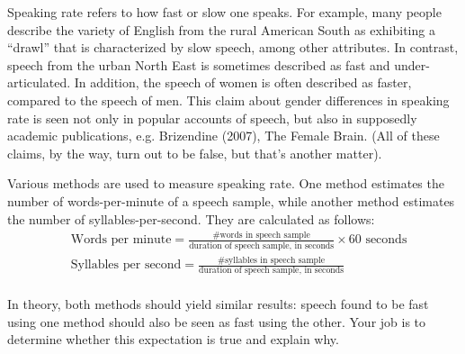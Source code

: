 \documentclass[lab=1,title={Speaking rate},turnin=false]{com310lab}
\begin{document}
\maketitle

\begin{overview}
	Speaking rate refers to how fast or slow one speaks.
	For example, many people describe the variety of English from the rural American South as exhibiting a ``drawl'' that is characterized by slow speech, among other attributes.
	In contrast, speech from the urban North East is sometimes described as fast and under-articulated.
	In addition, the speech of women is often described as faster, compared to the speech of men.
	This claim about gender differences in speaking rate is seen not only in popular accounts of speech, but also in supposedly academic publications, e.g. Brizendine (2007), The Female Brain.
	(All of these claims, by the way, turn out to be false, but that’s another matter).
\end{overview}


\begin{problem}
	Various methods are used to measure speaking rate.
	One method estimates the number of words-per-minute of a speech sample, while another method estimates the number of syllables-per-second.
	They are calculated as follows:\\

	\begin{equation*}
	\begin{aligned}
		&\mbox{Words per minute} = \frac{\mbox{\# words in speech sample}}{\mbox{duration of speech sample, in seconds}} \times 60 \mbox{ seconds}\\
		&\mbox{Syllables per second} = \frac{\mbox{\# syllables in speech sample}}{\mbox{duration of speech sample, in seconds}}
	\end{aligned}
	\end{equation*}\\

	In theory, both methods should yield similar results: speech found to be fast using one method should also be seen as fast using the other.
	Your job is to determine whether this expectation is true and explain why.
\end{problem}
\end{document}
